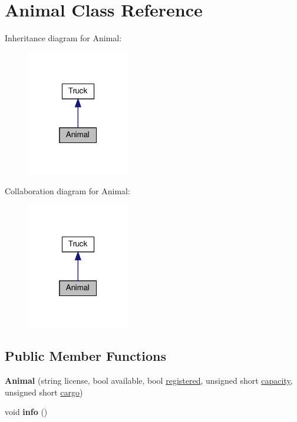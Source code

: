 \hypertarget{class_animal}{}\section{Animal Class Reference}
\label{class_animal}


Inheritance diagram for Animal\+:\nopagebreak
\begin{figure}[H]
\begin{center}
\leavevmode
\includegraphics[width=127pt]{class_animal__inherit__graph}
\end{center}
\end{figure}


Collaboration diagram for Animal\+:\nopagebreak
\begin{figure}[H]
\begin{center}
\leavevmode
\includegraphics[width=127pt]{class_animal__coll__graph}
\end{center}
\end{figure}
\subsection*{Public Member Functions}
\begin{DoxyCompactItemize}
\item 
\mbox{\label{class_animal_afdae9b8c4716472196e8cd62c762f88a}} 
{\bfseries Animal} (string license, bool available, bool \hyperlink{class_truck_a80b8405cf7a15b236fef70116f99c4fb}{registered}, unsigned short \hyperlink{class_truck_a14541fad6d47c606ce4e1bd150a68a23}{capacity}, unsigned short \hyperlink{class_truck_a968fc6b1a6171a03e4254d6615da4ecd}{cargo})
\item 
\mbox{\label{class_animal_a1e99083943239209f4fbe79380ea5991}} 
void {\bfseries info} ()
\end{DoxyCompactItemize}
